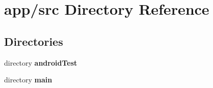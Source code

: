 \section{app/src Directory Reference}
\label{dir_f7f66ebd41ddd6e680d055c75f185c06}
\subsection*{Directories}
\begin{DoxyCompactItemize}
\item 
directory {\bf android\+Test}
\item 
directory {\bf main}
\end{DoxyCompactItemize}
